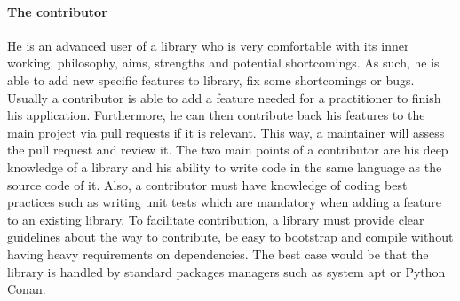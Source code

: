 \paragraph{The contributor} He is an advanced user of a library who is very comfortable with its inner working,
philosophy, aims, strengths and potential shortcomings. As such, he is able to add new specific features to library, fix
some shortcomings or bugs. Usually a contributor is able to add a feature needed for a practitioner to finish his
application. Furthermore, he can then contribute back his features to the main project via pull requests if it is
relevant. This way, a maintainer will assess the pull request and review it. The two main points of a contributor are
his deep knowledge of a library and his ability to write code in the same language as the source code of it. Also, a
contributor must have knowledge of coding best practices such as writing unit tests which are mandatory when adding a
feature to an existing library. To facilitate contribution, a library must provide clear guidelines about the way to
contribute, be easy to bootstrap and compile without having heavy requirements on dependencies. The best case would be
that the library is handled by standard packages managers such as system apt or Python Conan.

